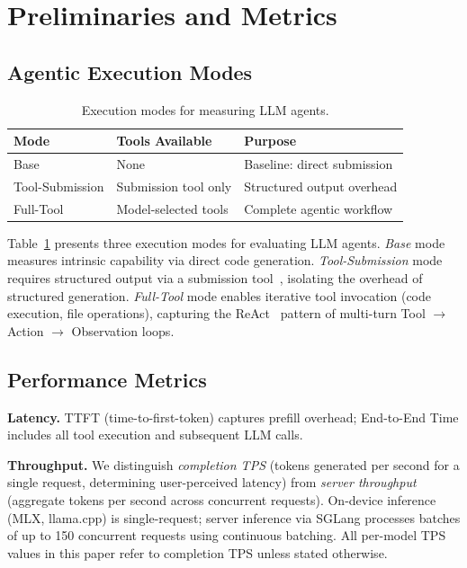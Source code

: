 \documentclass[sigconf,anonymous,review]{acmart}
\begin{document}
\section{Preliminaries and Metrics}
\label{sec:preliminaries}

\subsection{Agentic Execution Modes}

\begin{table}[t]
\centering
\caption{Execution modes for measuring LLM agents.}
\label{tab:modes}
\small
\begin{tabular}{@{} l l l @{}}
\toprule
\textbf{Mode} & \textbf{Tools Available} & \textbf{Purpose} \\
\midrule
Base & None & Baseline: direct submission \\
Tool-Submission & Submission tool only & Structured output overhead \\
Full-Tool & Model-selected tools & Complete agentic workflow \\
\bottomrule
\end{tabular}
\end{table}

Table~\ref{tab:modes} presents three execution modes for evaluating LLM agents.
\emph{Base} mode measures intrinsic capability via direct code generation.
\emph{Tool-Submission} mode requires structured output via a submission tool~\cite{openai2023functioncalling}, isolating the overhead of structured generation.
\emph{Full-Tool} mode enables iterative tool invocation (code execution, file operations), capturing the ReAct~\cite{yao2022react} pattern of multi-turn Tool $\rightarrow$ Action $\rightarrow$ Observation loops.

\subsection{Performance Metrics}

\noindent \textbf{Latency.}
TTFT (time-to-first-token) captures prefill overhead; End-to-End Time includes all tool execution and subsequent LLM calls.

\noindent \textbf{Throughput.}
We distinguish \emph{completion TPS} (tokens generated per second for a single request, determining user-perceived latency) from \emph{server throughput} (aggregate tokens per second across concurrent requests).
On-device inference (MLX, llama.cpp) is single-request; server inference via SGLang processes batches of up to 150 concurrent requests using continuous batching.
All per-model TPS values in this paper refer to completion TPS unless stated otherwise.
\end{document}
